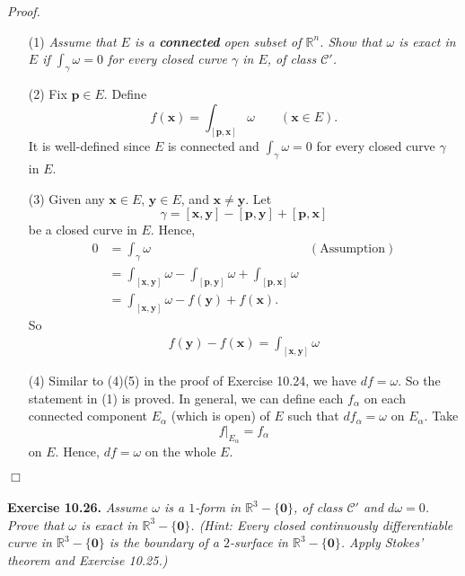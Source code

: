 \documentclass{article}
\begin{document}
\emph{Proof.}
\begin{enumerate}
\item[(1)]
  \emph{Assume that $E$ is a \textbf{connected} open subset of $\mathbb{R}^n$.
  Show that $\omega$ is exact in $E$
  if $\int_{\gamma} \omega = 0$
  for every closed curve $\gamma$ in $E$, of class $\mathscr{C}'$.}

\item[(2)]
  Fix $\mathbf{p} \in E$.
  Define
  \[
    f(\mathbf{x}) = \int_{[\mathbf{p},\mathbf{x}]} \omega
    \qquad
    (\mathbf{x} \in E).
  \]
  It is well-defined since $E$ is connected and
  $\int_{\gamma} \omega = 0$ for every closed curve $\gamma$ in $E$.

\item[(3)]
  Given any $\mathbf{x} \in E$, $\mathbf{y} \in E$, and $\mathbf{x} \neq \mathbf{y}$.
  Let
  \[
    \gamma = [\mathbf{x},\mathbf{y}] - [\mathbf{p},\mathbf{y}] + [\mathbf{p},\mathbf{x}]
  \]
  be a closed curve in $E$.
  Hence,
  \begin{align*}
    0
    &= \int_{\gamma} \omega
      &(\text{Assumption}) \\
    &= \int_{[\mathbf{x},\mathbf{y}]} \omega
      - \int_{[\mathbf{p},\mathbf{y}]} \omega
      + \int_{[\mathbf{p},\mathbf{x}]} \omega \\
    &= \int_{[\mathbf{x},\mathbf{y}]} \omega - f(\mathbf{y}) + f(\mathbf{x}).
  \end{align*}
  So
  \begin{align*}
    f(\mathbf{y}) - f(\mathbf{x}) = \int_{[\mathbf{x},\mathbf{y}]} \omega
  \end{align*}

\item[(4)]
  Similar to (4)(5) in the proof of Exercise 10.24, we have $df = \omega$.
  So the statement in (1) is proved.
  In general, we can define each $f_{\alpha}$
  on each connected component $E_{\alpha}$ (which is open) of $E$
  such that $d f_{\alpha} = \omega$ on $E_{\alpha}$.
  Take
  \[
    f|_{E_{\alpha}} = f_{\alpha}
  \]
  on $E$.
  Hence, $df = \omega$ on the whole $E$.
\end{enumerate}
$\Box$ \\\\






\textbf{Exercise 10.26.}
\emph{Assume $\omega$ is a $1$-form in $\mathbb{R}^3 - \{\mathbf{0}\}$,
of class $\mathscr{C}'$ and $d\omega = 0$.
Prove that $\omega$ is exact in $\mathbb{R}^3 - \{\mathbf{0}\}$.
(Hint: Every closed continuously differentiable curve in $\mathbb{R}^3 - \{\mathbf{0}\}$
is the boundary of a $2$-surface in $\mathbb{R}^3 - \{\mathbf{0}\}$.
Apply Stokes' theorem and Exercise 10.25.)} \\
\end{document}
